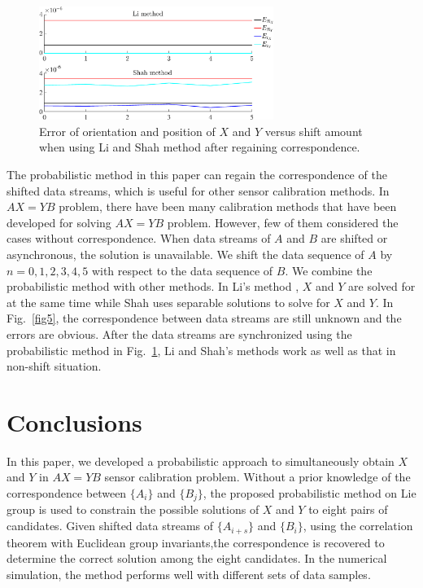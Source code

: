 \documentclass[letterpaper, 10 pt, conference]{ieeeconf}  %
\begin{document}
\begin{center}
\begin{figure}
\centering
\includegraphics[width=3in]{fig6.eps}
\caption{
Error of orientation and position of $X$ and $Y$ versus shift amount when using Li and Shah method after regaining correspondence.
}
\label{fig6}
\end{figure}
\end{center}
The probabilistic method in this paper can regain the correspondence of the shifted data streams, which is useful for other sensor calibration methods. In $AX=YB$ problem, there have been many calibration methods that have been developed for solving $AX=YB$ problem. However, few of them considered the cases without correspondence. When data streams of ${A}$ and ${B}$ are shifted or asynchronous, the solution is unavailable. We shift the data sequence of ${A}$ by $n=0,1,2,3,4,5$ with respect to the data sequence of ${B}$. We combine the probabilistic method with other methods. In Li's method \cite{Li2010}, $X$ and $Y$ are solved for at the same time while Shah \cite{Shah2013} uses separable solutions to solve for $X$ and $Y$. In Fig.~\ref{fig5}, the correspondence between data streams are still unknown and the errors are obvious. After the data streams are synchronized using the probabilistic method in Fig.~\ref{fig6}, Li and Shah's methods work as well as that in non-shift situation.

\section{Conclusions}
\label{sect5}

In this paper, we developed a probabilistic approach to simultaneously obtain  $X$ and $Y$ in $AX=YB$ sensor calibration problem. Without a prior knowledge of the correspondence between $\{A_i\}$ and $\{B_j\}$, the proposed probabilistic method on Lie group is used to constrain the possible solutions of $X$ and $Y$ to eight pairs of candidates. Given shifted data streams of $\{A_{i+s}\}$ and $\{B_i\}$, using the correlation theorem with Euclidean group invariants,the correspondence is recovered to determine the correct solution among the eight candidates. In the numerical simulation, the method performs well with different sets of data samples.
\end{document}
